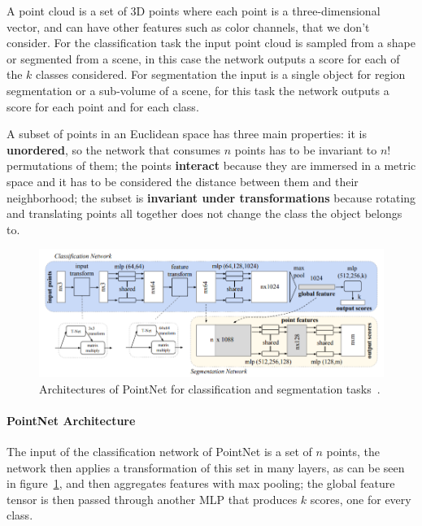 A point cloud is a set of 3D points where each point is a three-dimensional vector, and can have other features such as color channels, that we don't consider. For the classification task the input point cloud is sampled from a shape or segmented from a scene, in this case the network outputs a score for each of the $k$ classes considered. For segmentation the input is a single object for region segmentation or a sub-volume of a scene, for this task the network outputs a score for each point and for each class.

A subset of points in an Euclidean space has three main properties: it is \textbf{unordered}, so the network that consumes $n$ points has to be invariant to $n!$ permutations of them; the points \textbf{interact} because they are immersed in a metric space and it has to be considered the distance between them and their neighborhood; the subset is \textbf{invariant under transformations} because rotating and translating points all together does not change the class the object belongs to.

\begin{figure}[ht]
    \centering
    \includegraphics[width=\textwidth]{images/pointnet_architecture.png}
    \caption{Architectures of PointNet for classification and segmentation tasks~\cite{qi2017pointnet}.}
    \label{fig:pointnet_architecture}
\end{figure}

\paragraph{PointNet Architecture}

The input of the classification network of PointNet is a set of $n$ points, the network then applies a transformation of this set in many layers, as can be seen in figure~\ref{fig:pointnet_architecture}, and then aggregates features with max pooling; the global feature tensor is then passed through another MLP that produces $k$ scores, one for every class.

